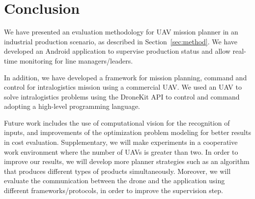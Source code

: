 \documentclass[12pt]{article}
\begin{document}
\section{Conclusion}
\label{sec:conclusao}

We have presented an evaluation methodology for UAV mission planner in an industrial production scenario, as described in Section~\ref{sec:method}. We have developed an Android application to supervise production status and allow real-time monitoring for line managers/leaders.
 
In addition, we have developed a framework for mission planning, command and control for intralogistics mission using a commercial UAV. We used an UAV to solve intralogistics problems using the DroneKit API to control and command adopting a high-level programming language.

Future work includes the use of computational vision for the recognition of inputs, and improvements of the optimization problem modeling for better results in cost evaluation. Supplementary, we will make experiments in a cooperative work environment where the number of UAVs is greater than two. In order to improve our results, we will develop more planner strategies such as an algorithm that produces different types of products simultaneously. Moreover, we will evaluate the communication between the drone and the application using different frameworks/protocols, in order to improve the supervision step.



\end{document}
